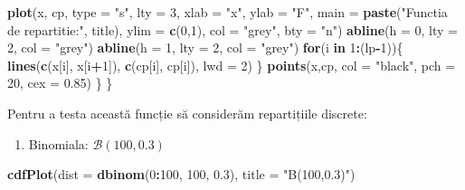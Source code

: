 \documentclass[]{article}
\newenvironment{Shaded}{\begin{snugshade}}{\end{snugshade}}
\newcommand{\KeywordTok}[1]{\textcolor[rgb]{0.13,0.29,0.53}{\textbf{#1}}}
\newcommand{\DataTypeTok}[1]{\textcolor[rgb]{0.13,0.29,0.53}{#1}}
\newcommand{\DecValTok}[1]{\textcolor[rgb]{0.00,0.00,0.81}{#1}}
\newcommand{\FloatTok}[1]{\textcolor[rgb]{0.00,0.00,0.81}{#1}}
\newcommand{\StringTok}[1]{\textcolor[rgb]{0.31,0.60,0.02}{#1}}
\newcommand{\ControlFlowTok}[1]{\textcolor[rgb]{0.13,0.29,0.53}{\textbf{#1}}}
\newcommand{\OperatorTok}[1]{\textcolor[rgb]{0.81,0.36,0.00}{\textbf{#1}}}
\newcommand{\NormalTok}[1]{#1}
\providecommand{\tightlist}{%
  \setlength{\itemsep}{0pt}\setlength{\parskip}{0pt}}
\begin{document}
\begin{Shaded}
\begin{Highlighting}[]
    \KeywordTok{plot}\NormalTok{(x, cp, }\DataTypeTok{type =} \StringTok{"s"}\NormalTok{, }\DataTypeTok{lty =} \DecValTok{3}\NormalTok{, }
         \DataTypeTok{xlab =} \StringTok{"x"}\NormalTok{, }
         \DataTypeTok{ylab =} \StringTok{"F"}\NormalTok{, }
         \DataTypeTok{main =} \KeywordTok{paste}\NormalTok{(}\StringTok{"Functia de repartitie:"}\NormalTok{, title), }
         \DataTypeTok{ylim =} \KeywordTok{c}\NormalTok{(}\DecValTok{0}\NormalTok{,}\DecValTok{1}\NormalTok{), }
         \DataTypeTok{col =} \StringTok{"grey"}\NormalTok{,}
         \DataTypeTok{bty =} \StringTok{"n"}\NormalTok{)}
    \KeywordTok{abline}\NormalTok{(}\DataTypeTok{h =} \DecValTok{0}\NormalTok{, }\DataTypeTok{lty =} \DecValTok{2}\NormalTok{, }\DataTypeTok{col =} \StringTok{"grey"}\NormalTok{)}
    \KeywordTok{abline}\NormalTok{(}\DataTypeTok{h =} \DecValTok{1}\NormalTok{, }\DataTypeTok{lty =} \DecValTok{2}\NormalTok{, }\DataTypeTok{col =} \StringTok{"grey"}\NormalTok{)}
    \ControlFlowTok{for}\NormalTok{(i }\ControlFlowTok{in} \DecValTok{1}\OperatorTok{:}\NormalTok{(lp}\OperatorTok{-}\DecValTok{1}\NormalTok{))\{}
      \KeywordTok{lines}\NormalTok{(}\KeywordTok{c}\NormalTok{(x[i], x[i}\OperatorTok{+}\DecValTok{1}\NormalTok{]), }\KeywordTok{c}\NormalTok{(cp[i], cp[i]), }\DataTypeTok{lwd =} \DecValTok{2}\NormalTok{)}
\NormalTok{    \}}
    \KeywordTok{points}\NormalTok{(x,cp, }\DataTypeTok{col =} \StringTok{"black"}\NormalTok{, }\DataTypeTok{pch =} \DecValTok{20}\NormalTok{, }\DataTypeTok{cex =} \FloatTok{0.85}\NormalTok{)}
\NormalTok{  \}}
\NormalTok{\}}
\end{Highlighting}
\end{Shaded}

Pentru a testa această funcție să considerăm repartițiile discrete:

\begin{enumerate}
\def\labelenumi{\alph{enumi})}
\tightlist
\item
  Binomiala: \(\mathcal{B}(100, 0.3)\)
\end{enumerate}

\begin{Shaded}
\begin{Highlighting}[]
\KeywordTok{cdfPlot}\NormalTok{(}\DataTypeTok{dist =} \KeywordTok{dbinom}\NormalTok{(}\DecValTok{0}\OperatorTok{:}\DecValTok{100}\NormalTok{, }\DecValTok{100}\NormalTok{, }\FloatTok{0.3}\NormalTok{), }\DataTypeTok{title =} \StringTok{"B(100,0.3)"}\NormalTok{)}
\end{Highlighting}
\end{Shaded}
\end{document}
